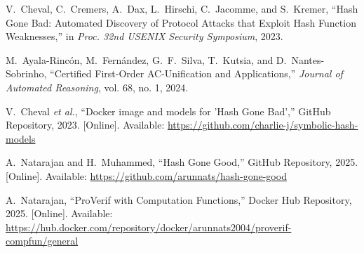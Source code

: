 \documentclass[journal]{IEEEtran}
\begin{document}
%
%
%
\begin{thebibliography}{9}

V.~Cheval, C.~Cremers, A.~Dax, L.~Hirschi, C.~Jacomme, and S.~Kremer, ``Hash Gone Bad: Automated Discovery of Protocol Attacks that Exploit Hash Function Weaknesses,'' in \emph{Proc. 32nd USENIX Security Symposium}, 2023.

M.~Ayala-Rincón, M.~Fernández, G.~F.~Silva, T.~Kutsia, and D.~Nantes-Sobrinho, ``Certified First-Order AC-Unification and Applications,'' \emph{Journal of Automated Reasoning}, vol. 68, no. 1, 2024.

V.~Cheval \emph{et al.}, ``Docker image and models for 'Hash Gone Bad','' GitHub Repository, 2023. [Online]. Available: \url{https://github.com/charlie-j/symbolic-hash-models}

A.~Natarajan and H.~Muhammed, ``Hash Gone Good,'' GitHub Repository, 2025. [Online]. Available: \url{https://github.com/arunnats/hash-gone-good}

A.~Natarajan, ``ProVerif with Computation Functions,'' Docker Hub Repository, 2025. [Online]. Available: \url{https://hub.docker.com/repository/docker/arunnats2004/proverif-compfun/general}

\end{thebibliography}

% 
\end{document}
